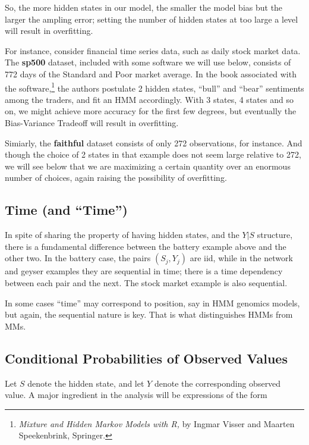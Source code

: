 \documentclass[11pt]{article}
\begin{document}
So, the more hidden states in our model, the smaller the model bias but
the larger the ampling error; setting the number of hidden states at too
large a level will result in overfitting.

For instance, consider financial time series data, such as daily stock
market data.  The \textbf{sp500} dataset, included with some software we
will use below, consists of 772 days of the Standard and Poor market
average.  In the book associated with the
software,\footnote{\textit{Mixture and Hidden Markov Models with R,} by
Ingmar Visser and Maarten Speekenbrink, Springer.} the authors postulate
2 hidden states, ``bull'' and ``bear'' sentiments among the traders, and
fit an HMM accordingly.  With 3 states, 4 states and so on, we might
achieve more accuracy for the first few degrees, but eventually the
Bias-Variance Tradeoff will result in overfitting.

Simiarly, the \textbf{faithful} dataset consists of only 272
observations, for instance.  And though the choice of 2 states in that
example does not seem large relative to 272, we will see below that we
are maximizing a certain quantity over an enormous number of choices,
again raising the possibility of overfitting.

\subsection{Time (and ``Time'')}

In spite of sharing the property of having hidden states, and the $Y|S$
structure, there is a fundamental difference between the battery example
above and the other two.  In the battery case, the pairs $(S_j,Y_j)$ are
iid, while in the network and geyser examples they are sequential in
time; there is a time dependency between each pair and the next.  The
stock market example is also sequential.

In some cases ``time'' may correspond to position, say in HMM genomics
models, but again, the sequential nature is key.  That is what
distinguishes HMMs from MMs.

\subsection{Conditional Probabilities of Observed Values}

Let $S$ denote the hidden state, and let $Y$ denote the corresponding
observed value.  A major ingredient in the analysis will be expressions of
the form
\end{document}
